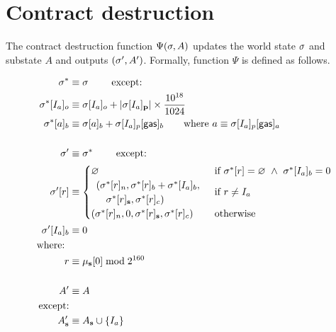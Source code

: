 

\section{Contract destruction}\label{sec:contract_destruct}

The contract destruction function $\Psi(\mathbf{\sigma},A)$ updates the world state $\mathbf{\sigma}$ and substate $A$ and outputs $(\mathbf{\sigma}',A')$. Formally, function $\Psi$ is defined as follows.

\begin{align}
	\st^*  &\eqdef \st \qquad \mbox{ except:}\\
		\st^*[I_a]_o &\eqdef \st[I_a]_o + \left|\st[I_a]_{\bf p}\right|\times \collateralperbyte \\
		\st^*[a]_b&\eqdef\st[a]_b+\st[I_a]_p[{\sf gas}]_b
		\qquad\text{where $a  \eqdef \st[I_a]_p[{\sf gas}]_a$}\\ 
	\notag \\ 
	\st'  &\eqdef \st^* \qquad \mbox{ except:}\\
	\st'[r] &\equiv \begin{cases}
		\varnothing &\text{if}\ \st^*[r] = \varnothing\ \wedge\ \st^*[I_{a}]_{b} = 0\\
		\begin{array}{l}
			(\st^*[r]_{n}, \st^*[r]_{b} + \st^*[I_{a}]_{b}, \\
			\quad\st^*[r]_{\mathbf{s}}, \st^*[r]_{c})
		\end{array} & \text{if}\ r \neq I_{a}\\
		(\st^*[r]_{n}, 0, \st^*[r]_{\mathbf{s}}, \st^*[r]_{c}) & \text{otherwise}
	\end{cases}\\
	\st'[I_{a}]_{b} &\eqdef 0 \\
		\mbox{where: } &\\ 
		 r &\eqdef \mst_{\mathbf{s}}[0] \bmod 2^{160} \\
	\notag \\
	A' & \eqdef A \\
	\mbox{except:} & \\ 
	A'_{\mathbf{s}} &\eqdef A_{\mathbf{s}} \cup \{I_a\}
\end{align}
